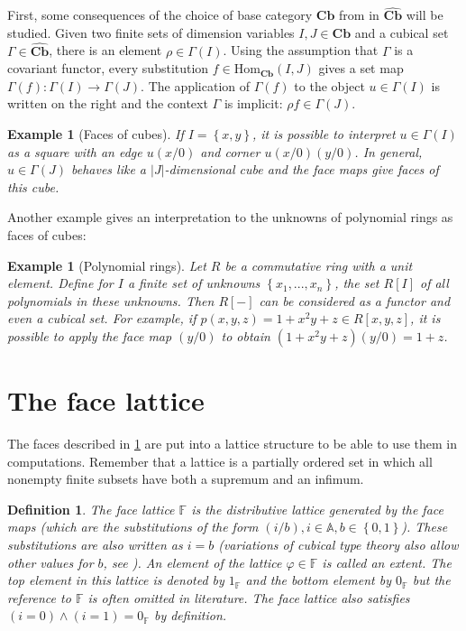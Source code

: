 \documentclass[12pt,a4paper,twoside,xetex]{book} %
\newcommand{\keyword}[1]{\emph{#1}\index{#1}}
\newtheorem{definition}[theorem]{Definition}
\newtheorem{example}[theorem]{Example}
\newcommand{\psh}[1]{\widehat{#1}}
\newcommand{\homo}[3]{\text{Hom}_{#1}\left(#2,#3\right)}
\newcommand{\cube}[0]{\textbf{Cb}}
\begin{document}
First, some consequences of the choice of base category $\cube$ from  in $\psh{\cube}$ will be studied. Given two finite sets of dimension variables $I,J \in \cube$ and a cubical set $\Gamma \in \psh{\cube}$,
there is an element $\rho \in \Gamma (I)$. Using the assumption that $\Gamma$ 
is a covariant functor, every substitution $f \in \homo{\cube}{I}{J}$ 
gives a set map $\Gamma (f) : \Gamma (I) \rightarrow \Gamma (J)$. 
The application of $\Gamma(f)$ to the object $u \in \Gamma (I)$ is written on 
the right and the context $\Gamma$ is implicit: $\rho f \in \Gamma(J)$. 

\begin{example}[Faces of cubes]\label{cubfaces}
If $I = \left\{x,y \right\}$, it is possible to interpret $u \in \Gamma(I)$ as 
a square with an edge $u(x/0)$ and corner $u(x/0)(y/0)$. In 
general, $u\in \Gamma (J)$ behaves like a $|J|$-dimensional cube and the face 
maps give faces of this cube.
\end{example}

Another example gives an interpretation to the unknowns of polynomial rings as faces of cubes:

\begin{example}[Polynomial rings]
Let $R$ be a commutative ring with a unit element. Define for $I$ a finite set 
of unknowns $\left\{x_1 , ..., x_n \right\}$, the set $R[I]$ of all polynomials 
in these unknowns. Then $R[-]$ can be considered as a functor and even a 
cubical set. For example, if $p(x,y,z) = 1 + x^2y +z \in R[x,y,z]$, it is 
possible to apply the face map $(y/0)$ to obtain $(1+x^2 y +z ) (y/0) = 1+z$.
\end{example}

\section{The face lattice}

The faces described in \cref{cubfaces} are put into a lattice structure to be able to use them in computations. Remember that a lattice is a partially ordered set in which all nonempty finite subsets have both a supremum and an infimum. 

\begin{definition}\label{facelattice}
The \keyword{face lattice} $\mathbb{F}$ is the distributive lattice generated 
by the face maps (which are the substitutions of the form $(i/b), i\in 
\mathbb{A}, b \in \left\{ 0,1 \right\}$). These substitutions are also written as $i = b$ (variations of cubical type theory also allow other values for $b$, see ). An element of the lattice $\varphi 
\in \mathbb{F}$ is called an \keyword{extent}. The top element in this lattice 
is denoted by $1_{\mathbb{F}}$ and the bottom element by $0_{\mathbb{F}}$ but 
the reference to $\mathbb{F}$ is often omitted in literature. The face lattice 
also satisfies $(i=0) \wedge (i=1) = 0_{\mathbb{F}}$ by definition. 
\end{definition}
\end{document}
